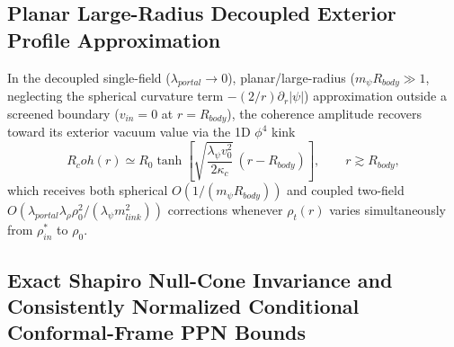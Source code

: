 \documentclass[american,11pt,letterpaper]{article}
\newcommand{\Rcoh}{R_{\mathrm{coh}}}
\def\mathrm#1{#1}%
\def\Rcoh{R_coh}%
\begin{document}
\subsection{Planar Large-Radius Decoupled Exterior Profile Approximation}

In the decoupled single-field ($\lambda_{\mathrm{portal}} \to 0$), planar/large-radius ($m_\psi R_{\mathrm{body}} \gg 1$, neglecting the spherical curvature term $-(2/r)\partial_r|\psi|$) approximation outside a screened boundary ($v_{\mathrm{in}} = 0$ at $r = R_{\mathrm{body}}$), the coherence amplitude recovers toward its exterior vacuum value via the 1D $\phi^4$ kink
\begin{equation}
\Rcoh(r) \simeq R_0 \tanh\!\left[\sqrt{\frac{\lambda_\psi v_0^2}{2\kappa_c}}\,(r - R_{\mathrm{body}})\right],
\qquad r \gtrsim R_{\mathrm{body}},
\label{eq:radial_tanh_profile}
\end{equation}
which receives both spherical $O(1/(m_\psi R_{\mathrm{body}}))$ and coupled two-field $O(\lambda_{\mathrm{portal}}\lambda_\rho\rho_0^2 / (\lambda_\psi m_{\mathrm{link}}^2))$ corrections whenever $\rho_t(r)$ varies simultaneously from $\rho_{\mathrm{in}}^*$ to $\rho_0$.

\subsection{Exact Shapiro Null-Cone Invariance and Consistently Normalized Conditional Conformal-Frame PPN Bounds}
\label{sec:ppn-shapiro-exact}
\end{document}
